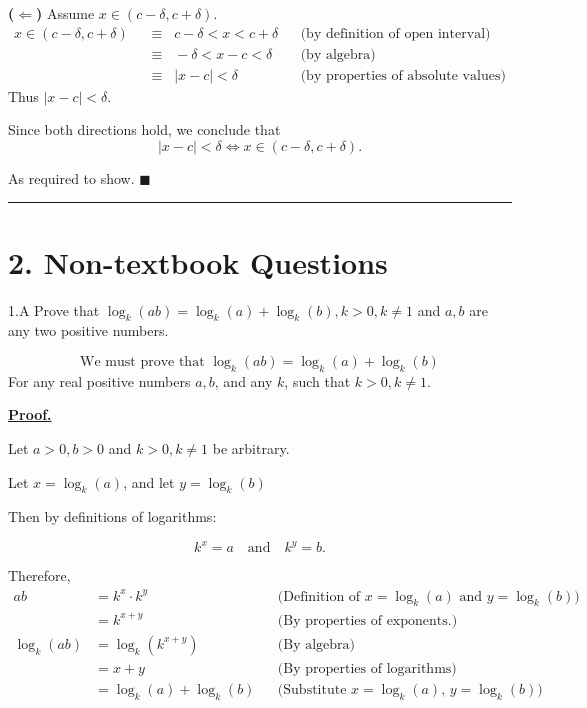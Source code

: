 \documentclass[]{article}
\begin{document}
\medskip

\noindent \textbf{($\Leftarrow$)}  
Assume $x \in (c-\delta, c+\delta)$.  
\begin{align*}
    x \in (c-\delta, c+\delta) 
    &\;\;\equiv\;\; c-\delta < x < c+\delta 
    && \text{(by definition of open interval)} \\[6pt]
    &\;\;\equiv\;\; -\delta < x-c < \delta 
    && \text{(by algebra)} \\[6pt]
    &\;\;\equiv\;\; |x-c| < \delta 
    && \text{(by properties of absolute values)}
\end{align*}
Thus $|x-c| < \delta$.  

\medskip

Since both directions hold, we conclude that
\[
|x-c| < \delta \iff x \in (c-\delta, c+\delta).
\]

As required to show. $\blacksquare$

\vspace{0.1in}
\hrule
\vspace{0.1in}

\section*{2. Non-textbook Questions}
\begin{question}{1.A}
Prove that $\log_k(ab) = \log_k(a) + \log_k(b), k > 0, k \ne 1$ and $a, b$ are any two positive numbers.
\end{question}
\[
\text{We must prove that } \log_k(ab) = \log_k(a) + \log_k(b)
\]
For any real positive numbers $a, b$, and any $k$, such that $k>0, k\ne1$.

\underline{\textbf{Proof.}}  

Let \(a>0, b>0\) and \(k>0, k\ne1\) be arbitrary. 

\medskip

Let $x = \log_k(a)$, and let $y = \log_k(b)$

Then by definitions of logarithms: 

\[
k^x = a \quad \text{and} \quad k^y = b.
\]

Therefore,
\begin{align*}
    ab &= k^x \cdot k^y && \text{(Definition of $x = \log_k(a)$ and $y = \log_k(b)$)}\\
       &= k^{x+y} && \text{(By properties of exponents.)}\\
    \log_k(ab) &= \log_k(k^{x+y}) && \text{(By algebra)}\\
               &= x+y && \text{(By properties of logarithms)}\\
               &= \log_k(a) + \log_k(b) && \text{(Substitute $x = \log_k(a)$, $y = \log_k(b)$)}
\end{align*}
\end{document}
